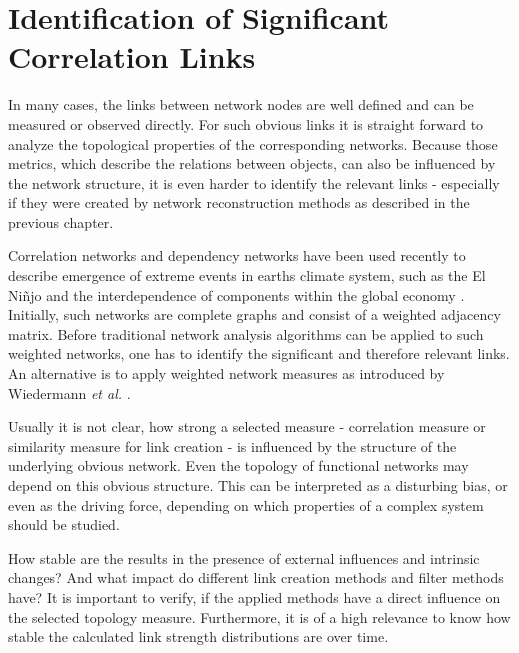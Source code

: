 \documentclass[a4paper,10pt]{scrbook}
\begin{document}
\clearpage
\newpage



\chapter{Identification of Significant Correlation Links}

\label{significantlinks} 
\label{IdentifySignificantLinks}



In many cases, the links between network nodes are well defined and can be measured or observed directly. For such obvious links it is straight forward to analyze the topological properties of the corresponding networks. Because those metrics, which describe the relations between objects, can also be influenced by the network structure, it is even harder to identify the relevant links - especially if they were created by network reconstruction methods as described in the previous chapter. 

Correlation networks and dependency networks have been used recently to describe emergence of extreme events in earths climate system, such as the El Ni\~njo \cite{Berezin2011, Gozolchiani2011} and the interdependence of components within the global economy \cite{Kenett2012}. Initially, such networks are complete graphs and consist of a weighted adjacency matrix. Before traditional network analysis algorithms can be applied to such weighted networks, one has to identify the significant and therefore relevant links. An alternative is to apply weighted network measures as introduced by Wiedermann \textit{et al.} \cite{Wiedermann2013}.

Usually it is not clear, how strong a selected measure - correlation measure or similarity measure for link creation - is influenced by the structure of the underlying obvious network. Even the topology of functional networks may depend on this obvious structure. This can be interpreted as a disturbing bias, or even as the  driving force, depending on which properties of a complex system should be studied. 

How stable are the results in the presence of external influences and intrinsic changes? And what impact do different link creation methods and filter methods have? It is important to verify, if the applied methods have a direct influence on the selected topology measure. Furthermore, it is of a high relevance to know how stable the calculated link strength distributions are over time. 
\end{document}
